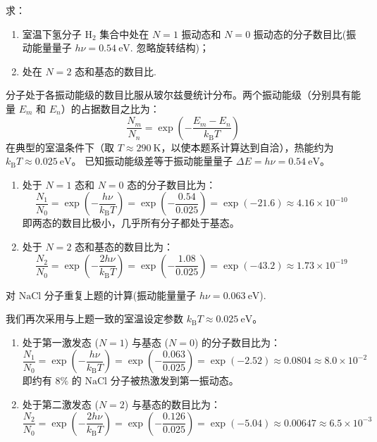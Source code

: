 \begin{exercise}\label{ex:26.6}
求：
\begin{enumerate}
  \item[(a)] 室温下氢分子 $\mathrm{H}_2$ 集合中处在 $N=1$ 振动态和 $N=0$ 振动态的分子数目比(振动能量量子 $h\nu = 0.54 \ \mathrm{eV}$. 忽略旋转结构)；
  \item[(b)] 处在 $N=2$ 态和基态的数目比.
\end{enumerate}
\end{exercise}
\begin{solution}
分子处于各振动能级的数目比服从玻尔兹曼统计分布。两个振动能级（分别具有能量 $E_m$ 和 $E_n$）的占据数目之比为：
$$ \frac{N_m}{N_n} = \exp\left( - \frac{E_m - E_n}{k_{\mathrm{B}} T} \right) $$
在典型的室温条件下（取 $T \approx 290 \ \mathrm{K}$，以使本题系计算达到自洽），热能约为 $k_{\mathrm{B}} T \approx 0.025 \ \mathrm{eV}$。
已知振动能级差等于振动能量量子 $\Delta E = h\nu = 0.54 \ \mathrm{eV}$。

\begin{enumerate}
    \item[(a)] 处于 $N=1$ 态和 $N=0$ 态的分子数目比为：
    $$ \frac{N_1}{N_0} = \exp\left( - \frac{h\nu}{k_{\mathrm{B}} T} \right) = \exp\left( - \frac{0.54}{0.025} \right) = \exp(-21.6) \approx 4.16 \times 10^{-10} $$
    即两态的数目比极小，几乎所有分子都处于基态。

    \item[(b)] 处于 $N=2$ 态和基态的数目比为：
    $$ \frac{N_2}{N_0} = \exp\left( - \frac{2h\nu}{k_{\mathrm{B}} T} \right) = \exp\left( - \frac{1.08}{0.025} \right) = \exp(-43.2) \approx 1.73 \times 10^{-19} $$
\end{enumerate}
\end{solution}

\begin{exercise}\label{ex:26.7}
对 $\mathrm{NaCl}$ 分子重复上题的计算(振动能量量子 $h\nu = 0.063 \ \mathrm{eV}$).
\end{exercise}
\begin{solution}
我们再次采用与上题一致的室温设定参数 $k_{\mathrm{B}} T \approx 0.025 \ \mathrm{eV}$。

\begin{enumerate}
    \item[(a)] 处于第一激发态 ($N=1$) 与基态 ($N=0$) 的分子数目比为：
    $$ \frac{N_1}{N_0} = \exp\left( - \frac{h\nu}{k_{\mathrm{B}} T} \right) = \exp\left( - \frac{0.063}{0.025} \right) = \exp(-2.52) \approx 0.0804 \approx 8.0 \times 10^{-2} $$
    即约有 $8\%$ 的 $\mathrm{NaCl}$ 分子被热激发到第一振动态。

    \item[(b)] 处于第二激发态 ($N=2$) 与基态的数目比为：
    $$ \frac{N_2}{N_0} = \exp\left( - \frac{2h\nu}{k_{\mathrm{B}} T} \right) = \exp\left( - \frac{0.126}{0.025} \right) = \exp(-5.04) \approx 0.00647 \approx 6.5 \times 10^{-3} $$
\end{enumerate}
\end{solution}

